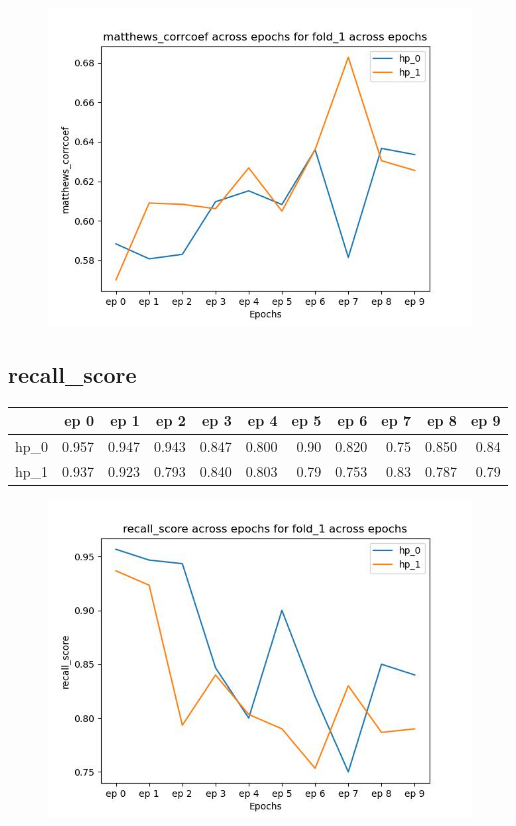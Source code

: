 \documentclass{article}
\begin{document}
\begin{figure}[H]
\includegraphics[scale = 0.75]{fold_1/matthews_corrcoef}
\end{figure}
\subsection{recall\_score}
\begin{tabular}{lrrrrrrrrrr}
\toprule
{} &   ep 0 &   ep 1 &   ep 2 &   ep 3 &   ep 4 &  ep 5 &   ep 6 &  ep 7 &   ep 8 &  ep 9 \\
\midrule
hp\_0 &  0.957 &  0.947 &  0.943 &  0.847 &  0.800 &  0.90 &  0.820 &  0.75 &  0.850 &  0.84 \\
hp\_1 &  0.937 &  0.923 &  0.793 &  0.840 &  0.803 &  0.79 &  0.753 &  0.83 &  0.787 &  0.79 \\
\bottomrule
\end{tabular}

\begin{figure}[H]
\includegraphics[scale = 0.75]{fold_1/recall_score}
\end{figure}
\end{document}
